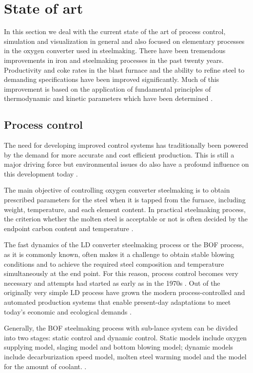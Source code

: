 \section{State of art}

In this section we deal with the current state of the art of process control, simulation and visualization in general and also focused on elementary processes in the oxygen converter used in steelmaking. There have been tremendous improvements in iron and steelmaking processes in the past twenty years. Productivity and coke rates in the blast furnace and the ability to refine steel to demanding specifications have been improved significantly. Much of this improvement is based on the application of fundamental principles of thermodynamic and kinetic parameters which have been determined \citep{Turkdogan1999}.

\subsection{Process control}

The need for developing improved control systems has traditionally been powered by the demand for more accurate and cost efficient production. This is still a major driving force but environmental issues do also have a profound influence on this development today \citep{Widlund1998}.

The main objective of controlling oxygen converter steelmaking is to obtain prescribed parameters for the steel when it is tapped from the furnace, including weight, temperature, and each element content. In practical steelmaking process, the criterion whether the molten steel is acceptable or not is often decided by the endpoint carbon content and temperature \citep{Wang2010}.

The fast dynamics of the LD converter steelmaking process or the BOF process, as it is commonly known, often makes it a challenge to obtain stable blowing conditions and to achieve the required steel composition and temperature simultaneously at the end point. For this reason, process control becomes very necessary and attempts had started as early as in the 1970s \citep{Fritz2005}. Out of the originally very simple LD process have grown the modern process-controlled and automated production systems that enable present-day adaptations to meet today’s economic and ecological demands \citep{Sarkar2015}.

Generally, the BOF steelmaking process with sub-lance system can be divided into two stages: static control and dynamic control. Static models include oxygen supplying model, slaging model and bottom blowing model; dynamic models include decarburization speed model, molten steel warming model and the model for the amount of coolant. \citep{Wang2010}.


